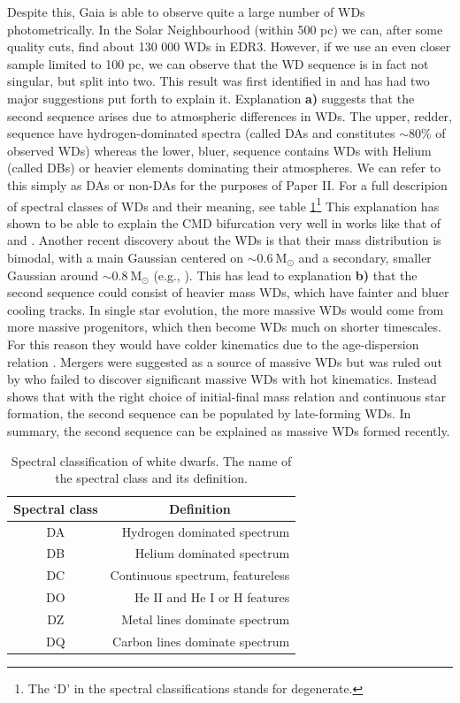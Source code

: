 Despite this, Gaia is able to observe quite a large number of WDs photometrically. In the Solar Neighbourhood (within 500 pc) we can, after some quality cuts, find about 130 000 WDs in EDR3. However, if we use an even closer sample limited to 100 pc, we can observe that the WD sequence is in fact not singular, but split into two. This result was first identified in \cite{dr2:hr} and has had two major suggestions put forth to explain it. Explanation \textbf{a)} suggests that the second sequence arises due to atmospheric differences in WDs. The upper, redder, sequence have hydrogen-dominated spectra (called DAs and constitutes {$\sim$}80\% of observed WDs) whereas the lower, bluer, sequence contains WDs with Helium (called DBs) or heavier elements dominating their atmospheres. We can refer to this simply as DAs or non-DAs for the purposes of Paper II. For a full descripion of spectral classes of WDs and their meaning, see table \ref{tab:p2-wds}\footnote{The `D' in the spectral classifications stands for degenerate.} This explanation has shown to be able to explain the CMD bifurcation very well in works like that of \cite{kilic:18, kilic:20} and \cite{gentile-fusilo:19}. Another recent discovery about the WDs is that their mass distribution is bimodal, with a main Gaussian centered on ${\sim}0.6\ \mathrm{M}_\odot$ and a secondary, smaller Gaussian around ${\sim}0.8\ \mathrm{M}_\odot$ (e.g., \citealt{elbadry:18, kilic:18, kilic:20}). This has lead to explanation \textbf{b)} that the second sequence could consist of heavier mass WDs, which have fainter and bluer cooling tracks. In single star evolution, the more massive WDs would come from more massive progenitors, which then become WDs much on shorter timescales. For this reason they would have colder kinematics due to the age-dispersion relation \citep{aumer:16}. Mergers were suggested as a source of massive WDs but was ruled out by \cite{kilic:20} who failed to discover significant massive WDs with hot kinematics. Instead \cite{elbadry:18} shows that with the right choice of initial-final mass relation and continuous star formation, the second sequence can be populated by late-forming WDs. In summary, the second sequence can be explained as massive WDs formed recently. 
\begin{table}[t!]
\caption{Spectral classification of white dwarfs. The name of the spectral class and its definition.}\label{tab:p2-wds}
\begin{tabular}{|c|r|}
\hline
\textbf{Spectral class} & \multicolumn{1}{c|}{\textbf{Definition}} \\ \hline
DA & Hydrogen dominated spectrum \\
DB & Helium dominated spectrum \\
DC & Continuous spectrum, featureless \\
DO & He II and He I or H features \\
DZ & Metal lines dominate spectrum \\
DQ & Carbon lines dominate spectrum \\\hline
\end{tabular}
\end{table}
